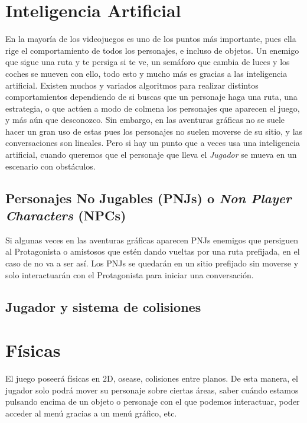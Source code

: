 	\section{Inteligencia Artificial}
	En la mayoría de los videojuegos es uno de los puntos más importante, pues ella rige el comportamiento de todos los personajes, e incluso de objetos. Un enemigo que sigue una ruta y te persiga si te ve, un semáforo que cambia de luces y los coches se mueven con ello, todo esto y mucho más es gracias a las inteligencia artificial. Existen muchos y variados algoritmos para realizar distintos comportamientos dependiendo de si buscas que un personaje haga una ruta, una estrategia, o que actúen a modo de colmena los personajes que aparecen el juego, y más aún que desconozco. Sin embargo, en las aventuras gráficas no se suele hacer un gran uso de estas pues los personajes no suelen moverse de su sitio, y las conversaciones son lineales. Pero si hay un punto que a veces usa una inteligencia artificial, cuando queremos que el personaje que lleva el \emph{Jugador} se mueva en un escenario con obstáculos.
        
            \subsection{Personajes No Jugables (PNJs) o \emph{Non Player Characters} (NPCs)}
        	Si algunas veces en las aventuras gráficas aparecen PNJs enemigos que persiguen al Protagonista o amistosos que estén dando vueltas por una ruta prefijada, en el caso de \nombrejuego no va a ser así. Los PNJs se quedarán en un sitio prefijado sin moverse y solo interactuarán con el Protagonista para iniciar una conversación. 
        	
            \subsection{Jugador y sistema de colisiones}
            
            
            
	    \section{Físicas}
	    El juego poseerá físicas en 2D, osease, colisiones entre planos. De esta manera, el jugador solo podrá mover su personaje sobre ciertas áreas, saber cuándo estamos pulsando encima de un objeto o personaje con el que podemos interactuar, poder acceder al menú gracias a un menú gráfico, etc.